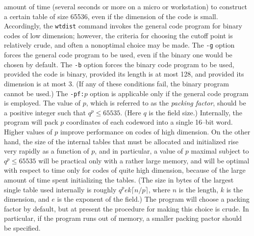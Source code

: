amount of time (several seconds or more on a micro or workstation) to 
construct a certain table of size 65536, even if the 
dimension of the code is small.  Accordingly, the {\tt wtdist} command
invokes the general code program for binary codes of low dimension; however,
the criteria for choosing the cutoff point is relatively crude, and often
a nonoptimal choice may be made.  The {\tt -g} option forces the general
code program to be used, even if the binary one would be chosen by default.
The {\tt -b} option forces the binary code program to be used, provided the
code is binary, provided its length is at most 128, and provided its 
dimension is at most 3.  (If any of these conditions fail, the binary
program cannot be used.)  
\medbreak
The {\tt -pf:}$p$ option is applicable only if
the general code program is employed.  The value of $p$, which is referred
to as the {\it packing factor}, should be a positive integer such that
$q^p\leq 65535$.  (Here $q$ is the field size.)  Internally, the program will pack
$p$ coordinates of each codeword into a single 16--bit word.  Higher values
of $p$ improve performance on codes of high dimension.  On the other hand,
the size of the internal tables that must be allocated and initialized
rise very rapidly as a function of $p$, and in particular, a value of 
$p$ maximal subject to $q^p\leq 65535$ will be practical only with a 
rather large memory, and will be optimal with respect to time 
only for codes of quite high dimension, because of the large amount of time
spent initializing the tables.  (The size in bytes of the largest single
table used internally is roughly $q^p e k \lceil n/p\rceil$, where $n$ is
the length, $k$ is the dimension, and $e$ is the exponent of the field.)
The program will choose a packing factor by default, but at present the
procedure for making this choice is crude.  In particular, if the program
runs out of memory, a smaller packing pactor should be specified.
%
%
